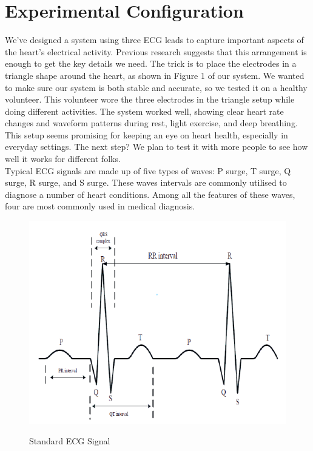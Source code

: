 \section{Experimental Configuration}
 We've designed a system using three ECG leads to capture important aspects of the heart's electrical activity. Previous research suggests that this arrangement is enough to get the key details we need. The trick is to place the electrodes in a triangle shape around the heart, as shown in Figure 1 of our system. We wanted to make sure our system is both stable and accurate, so we tested it on a healthy volunteer. This volunteer wore the three electrodes in the triangle setup while doing different activities. The system worked well, showing clear heart rate changes and waveform patterns during rest, light exercise, and deep breathing. This setup seems promising for keeping an eye on heart health, especially in everyday settings. The next step? We plan to test it with more people to see how well it works for different folks.
\\
Typical ECG signals are made up of five types of waves:
P surge, T surge, Q surge, R surge, and S surge. These waves intervals are commonly utilised to diagnose a number of heart conditions. Among all the features of these waves, four are most commonly used in medical diagnosis.
 \begin{figure}[htbp]
    \centering
     \includegraphics[width=0.9\linewidth]{C_chap/fig8.png}
\\\caption{Standard ECG Signal}
 \end{figure}
